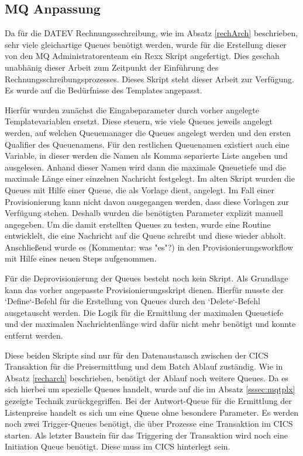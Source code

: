 \subsection{MQ Anpassung}\label{ssec:mqentw}
Da für die DATEV Rechnungssschreibung, wie im Absatz \ref{rechArch} beschrieben, sehr viele gleichartige Queues benötigt werden, wurde für die Erstellung dieser von den MQ Administratorenteam ein Rexx Skript angefertigt.
Dies geschah unabhänig dieser Arbeit zum Zeitpunkt der Einführung des Rechnungsschreibungsprozesses.
Dieses Skript steht dieser Arbeit zur Verfügung.
Es wurde auf die Bedürfnisse des Templates angepasst.

Hierfür wurden zunächst die Eingabeparameter durch vorher angelegte Templatevariablen ersetzt.
Diese steuern, wie viele Queues jeweils angelegt werden, auf welchen Queuemanager die Queues angelegt werden und den ersten Qualifier des Queuenamens.
Für den restlichen Queuenamen existiert auch eine Variable, in dieser werden die Namen als Komma separierte Liste angeben und ausgelesen.
Anhand dieser Namen wird dann die maximale Queuetiefe und die maximale Länge einer einzelnen Nachricht festgelegt.
Im alten Skript wurden die Queues mit Hilfe einer Queue, die als Vorlage dient, angelegt.
Im Fall einer Provisionierung kann nicht davon ausgegangen werden, dass diese Vorlagen zur Verfügung stehen.
Deshalb wurden die benötigten Parameter explizit manuell angegeben.
Um die damit erstellten Queues zu testen, wurde eine Routine entwicklelt, die eine Nachricht auf die Queue schreibt und diese wieder abholt.
Anschließend wurde es (Kommentar: was "es"?) in den Provisionierungsworkflow mit Hilfe eines neuen Steps aufgenommen.

Für die Deprovisionierung der Queues besteht noch kein Skript.
Als Grundlage kann das vorher angepasste Provisionierungsskript dienen.
Hierfür musste der `Define`-Befehl für die Erstellung von Queues durch den `Delete`-Befehl ausgetauscht werden.
Die Logik für die Ermittlung der maximalen Queuetiefe und der maximalen Nachrichtenlänge wird dafür nicht mehr benötigt und konnte entfernt werden.

Diese beiden Skripte sind nur für den Datenaustausch zwischen der CICS Transaktion für die Preisermittlung und dem Batch Ablauf zuständig.
Wie in Absatz \ref{recharch} beschrieben, benötigt der Ablauf noch weitere Queues.
Da es sich hierbei um spezielle Queues handelt, wurde auf die im Absatz \ref{sssec:mqtplx} gezeigte Technik zurückgegriffen.
Bei der Antwort-Queue für die Ermittlung der Listenpreise handelt es sich um eine Queue ohne besondere Parameter.
Es werden noch zwei Trigger-Queues benötigt, die über Prozesse eine Transaktion im CICS starten.
Als letzter Baustein für das Triggering der Transaktion wird noch eine Initiation Queue benötigt.
Diese muss im CICS hinterlegt sein.

